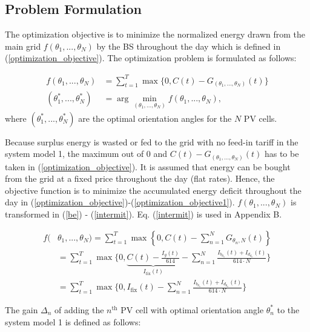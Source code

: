 \subsection{Problem Formulation \label{generalization}}
The optimization objective is to minimize the normalized energy drawn from the main grid $f(\theta_1, ..., \theta_N)$ by the BS throughout the day which is defined in (\ref{optimization_objective}). The optimization problem is formulated as follows:

\begin{align}
f(\theta_1, ..., \theta_N)&=\sum_{t=1}^T \max\{0, C(t)-G_{(\theta_1, ..., \theta_N)}(t)\} \label{optimization_objective}\\
(\theta_1^*, ..., \theta_N^*)&=\arg \underset{(\theta_1, ..., \theta_N)}{\min}f(\theta_1, ..., \theta_N) \label{optimization_objective1},
\end{align}
where $(\theta_1^*, ..., \theta_N^*)$ are the optimal orientation angles for the $N$ PV cells.




Because surplus energy is wasted or fed to the grid with no feed-in tariff in the system model 1, the maximum out of  $0$ and $C(t) - G_{(\theta_1, ..., \theta_N)}(t)$ has to be taken in (\ref{optimization_objective}). It is assumed that energy can be bought from the grid at a fixed price throughout the day (flat rates). Hence, the objective function is to minimize the accumulated energy deficit throughout the day in (\ref{optimization_objective})-(\ref{optimization_objective1}). $f(\theta_1, ..., \theta_N)$ is transformed in (\ref{be}) - (\ref{intermit}). Eq. (\ref{intermit}) is used in Appendix B.




\begin{align}
f(&\theta_1, ..., \theta_N)=\sum_{t=1}^T \max\left\{0, C(t)-\sum_{n=1}^N G_{\theta_n,N}(t)\right\}\label{be}\\
&= \sum_{t=1}^T \max\bigg\{0, \underbrace{C(t)-\frac{I_{g}(t)}{614}}_{I_{\text{fix}}(t)}-\sum_{n=1}^N \frac{I_{b_{\theta_n}}(t)+I_{d_{\theta_n}}(t)}{{614}\cdot N}\bigg\}\\
&= \sum_{t=1}^T \max\bigg\{0,I_{\text{fix}}(t)-\sum_{n=1}^N \frac{I_{b_{\theta_n}}(t)+I_{d_{\theta_n}}(t)}{{614}\cdot N}\bigg\}\label{intermit}
\end{align}


The gain $\Delta_n$ of adding the $n^{\mathrm{th}}$ PV cell with optimal orientation angle $\theta_n^*$ to the system model 1 is defined as follows:


